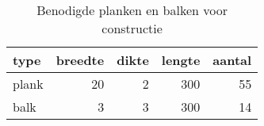 \begin{table}[h!]
\centering
\caption{Benodigde planken en balken voor constructie}
\begin{tabular}{lrrrr}
\toprule
 type &  breedte &  dikte &  lengte &  aantal \\
\midrule
plank &       20 &      2 &     300 &      55 \\
 balk &        3 &      3 &     300 &      14 \\
\bottomrule
\end{tabular}
\end{table}
